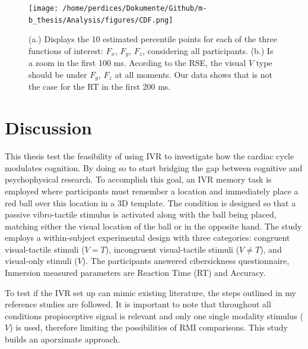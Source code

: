 \documentclass[12pt,oneside,openright]{report}
\begin{document}
\begin{figure}[!ht]
    \centering
    \texttt{[image: /home/perdices/Dokumente/Github/m-b\_thesis/Analysis/figures/CDF.png]}
    \caption{ (a.) Displays the 10 estimated percentile points for each of the three functions of interest: $F_x$, $F_y$, $F_z$, considering all participants. (b.) Is a zoom in the first 100 ms. Acording to the RSE, the visual $V$ type should be under $F_y$, $F_z$ at all moments. Our data shows that is not the case for the RT in the first 200 ms.}
    \label{fig:CDF}
\end{figure}


\section*{Discussion}

This thesis test the feasibility of using IVR to investigate how the cardiac cycle modulates cognition. By doing so to start bridging the gap between cognitive and psychophysical research. To accomplish this goal, an IVR memory task is employed where participants must remember a location and immediately place a red ball over this location in a 3D template. The condition is designed so that a passive vibro-tactile stimulus is activated along with the ball being placed, matching either the visual location of the ball or in the opposite hand. The study employs a within-subject experimental design with three categories: congruent visual-tactile stimuli ($V=T$), incongruent visual-tactile stimuli ($V \neq T$), and visual-only stimuli ($V$). The participants answered cibersickness questionnaire, Inmersion measured parameters are Reaction Time (RT) and Accuracy.

To test if the IVR set up can mimic existing literature, the steps outlined in my reference studies \parencite{Innes2019ACA, SALTAFOSSI2023108642, Ulrich2007} are followed. It is important to note that throughout all conditions propioceptive signal is relevant and only one single modality stimulus ($V$) is used, therefore limiting the possibilities of RMI comparisons. This study builds an aporximate approach.
\end{document}
